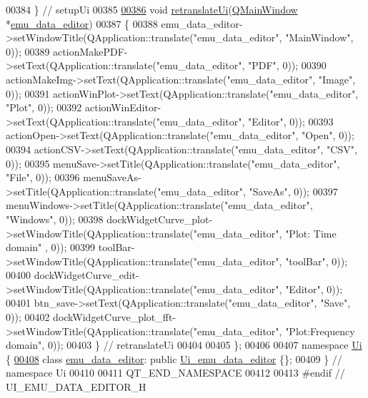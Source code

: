 \begin{DoxyCode}
00384     \} \textcolor{comment}{// setupUi}
00385 
\hypertarget{a00138_source_l00386}{}\hyperlink{a00079_a4118bb421fd84731231aa1429fedf5f8}{00386}     \textcolor{keywordtype}{void} \hyperlink{a00079_a4118bb421fd84731231aa1429fedf5f8}{retranslateUi}(\hyperlink{a00058}{QMainWindow} *\hyperlink{a00008}{emu\_data\_editor})
00387     \{
00388         emu\_data\_editor->setWindowTitle(QApplication::translate(\textcolor{stringliteral}{"emu\_data\_editor"}, \textcolor{stringliteral}{"MainWindow"}, 0));
00389         actionMakePDF->setText(QApplication::translate(\textcolor{stringliteral}{"emu\_data\_editor"}, \textcolor{stringliteral}{"PDF"}, 0));
00390         actionMakeImg->setText(QApplication::translate(\textcolor{stringliteral}{"emu\_data\_editor"}, \textcolor{stringliteral}{"Image"}, 0));
00391         actionWinPlot->setText(QApplication::translate(\textcolor{stringliteral}{"emu\_data\_editor"}, \textcolor{stringliteral}{"Plot"}, 0));
00392         actionWinEditor->setText(QApplication::translate(\textcolor{stringliteral}{"emu\_data\_editor"}, \textcolor{stringliteral}{"Editor"}, 0));
00393         actionOpen->setText(QApplication::translate(\textcolor{stringliteral}{"emu\_data\_editor"}, \textcolor{stringliteral}{"Open"}, 0));
00394         actionCSV->setText(QApplication::translate(\textcolor{stringliteral}{"emu\_data\_editor"}, \textcolor{stringliteral}{"CSV"}, 0));
00395         menuSave->setTitle(QApplication::translate(\textcolor{stringliteral}{"emu\_data\_editor"}, \textcolor{stringliteral}{"File"}, 0));
00396         menuSaveAs->setTitle(QApplication::translate(\textcolor{stringliteral}{"emu\_data\_editor"}, \textcolor{stringliteral}{"SaveAs"}, 0));
00397         menuWindows->setTitle(QApplication::translate(\textcolor{stringliteral}{"emu\_data\_editor"}, \textcolor{stringliteral}{"Windows"}, 0));
00398         dockWidgetCurve\_plot->setWindowTitle(QApplication::translate(\textcolor{stringliteral}{"emu\_data\_editor"}, \textcolor{stringliteral}{"Plot: Time domain"}
      , 0));
00399         toolBar->setWindowTitle(QApplication::translate(\textcolor{stringliteral}{"emu\_data\_editor"}, \textcolor{stringliteral}{"toolBar"}, 0));
00400         dockWidgetCurve\_edit->setWindowTitle(QApplication::translate(\textcolor{stringliteral}{"emu\_data\_editor"}, \textcolor{stringliteral}{"Editor"}, 0));
00401         btn\_save->setText(QApplication::translate(\textcolor{stringliteral}{"emu\_data\_editor"}, \textcolor{stringliteral}{"Save"}, 0));
00402         dockWidgetCurve\_plot\_fft->setWindowTitle(QApplication::translate(\textcolor{stringliteral}{"emu\_data\_editor"}, \textcolor{stringliteral}{"Plot:Frequency
       domain"}, 0));
00403     \} \textcolor{comment}{// retranslateUi}
00404 
00405 \};
00406 
00407 \textcolor{keyword}{namespace }\hyperlink{a00145}{Ui} \{
\hypertarget{a00138_source_l00408}{}\hyperlink{a00009}{00408}     \textcolor{keyword}{class }\hyperlink{a00009}{emu\_data\_editor}: \textcolor{keyword}{public} \hyperlink{a00079}{Ui\_emu\_data\_editor} \{\};
00409 \} \textcolor{comment}{// namespace Ui}
00410 
00411 QT\_END\_NAMESPACE
00412 
00413 \textcolor{preprocessor}{#endif // UI\_EMU\_DATA\_EDITOR\_H}
\end{DoxyCode}
